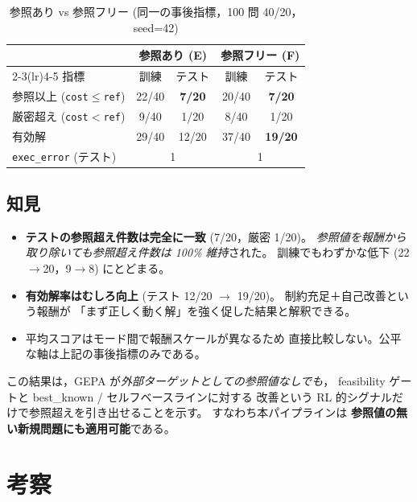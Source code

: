 \documentclass[uplatex,dvipdfmx,a4paper,11pt]{jsarticle}
\begin{document}
\begin{table}[htbp]
  \centering
  \caption{参照あり vs 参照フリー (同一の事後指標，100 問 40/20，seed=42)}
  \label{tab:noref}
  \begin{tabular}{lcccc}
    \toprule
    & \multicolumn{2}{c}{参照あり (E)} & \multicolumn{2}{c}{参照フリー (F)} \\
    \cmidrule(lr){2-3}\cmidrule(lr){4-5}
    指標 & 訓練 & テスト & 訓練 & テスト \\
    \midrule
    参照以上 (\texttt{cost}$\le$\texttt{ref}) & 22/40 & \textbf{7/20} & 20/40 & \textbf{7/20} \\
    厳密超え (\texttt{cost}$<$\texttt{ref}) & 9/40 & 1/20 & 8/40 & 1/20 \\
    有効解 & 29/40 & 12/20 & 37/40 & \textbf{19/20} \\
    \texttt{exec\_error} (テスト) & \multicolumn{2}{c}{1} & \multicolumn{2}{c}{1} \\
    \bottomrule
  \end{tabular}
\end{table}

\subsection{知見}

\begin{itemize}
  \item \textbf{テストの参照超え件数は完全に一致} (7/20，厳密 1/20)。
    \emph{参照値を報酬から取り除いても参照超え件数は 100\% 維持}された。
    訓練でもわずかな低下 (22$\to$20，9$\to$8) にとどまる。
  \item \textbf{有効解率はむしろ向上} (テスト 12/20 $\to$ 19/20)。
    制約充足＋自己改善という報酬が
    「まず正しく動く解」を強く促した結果と解釈できる。
  \item 平均スコアはモード間で報酬スケールが異なるため
    直接比較しない。公平な軸は上記の事後指標のみである。
\end{itemize}

この結果は，GEPA が\emph{外部ターゲットとしての参照値なしでも}，
feasibility ゲートと best\_known / セルフベースラインに対する
改善という RL 的シグナルだけで参照超えを引き出せることを示す。
すなわち本パイプラインは
\textbf{参照値の無い新規問題にも適用可能}である。

\section{考察}\label{sec:disc}
\end{document}
